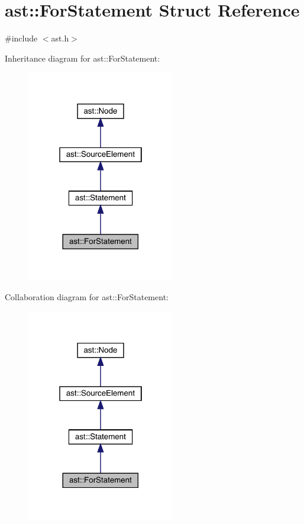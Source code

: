 \hypertarget{structast_1_1_for_statement}{}\section{ast\+:\+:For\+Statement Struct Reference}
\label{structast_1_1_for_statement}


{\ttfamily \#include $<$ast.\+h$>$}



Inheritance diagram for ast\+:\+:For\+Statement\+:
\nopagebreak
\begin{figure}[H]
\begin{center}
\leavevmode
\includegraphics[width=183pt]{structast_1_1_for_statement__inherit__graph}
\end{center}
\end{figure}


Collaboration diagram for ast\+:\+:For\+Statement\+:
\nopagebreak
\begin{figure}[H]
\begin{center}
\leavevmode
\includegraphics[width=183pt]{structast_1_1_for_statement__coll__graph}
\end{center}
\end{figure}
